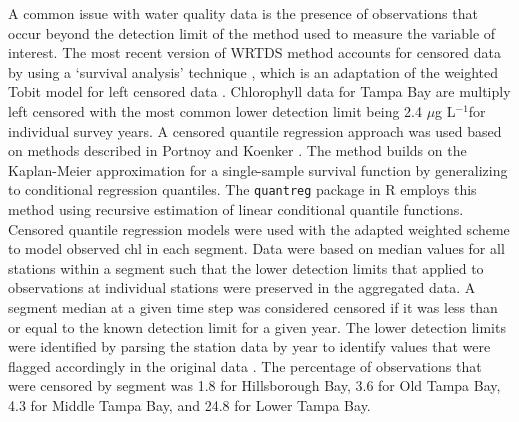 \documentclass{svjour3}\usepackage[]{graphicx}\usepackage[]{color}
\newcommand{\mugl}{$\mu$g L$^{-1}$}
\begin{document}
A common issue with water quality data is the presence of observations that occur beyond the detection limit of the method used to measure the variable of interest.  The most recent version of \ac{WRTDS} method accounts for censored data by using a `survival analysis' technique \cite{Moyer12,Hirsch14}, which is an adaptation of the weighted Tobit model for left censored data \cite{Tobin58}.  Chlorophyll data for Tampa Bay are multiply left censored with the most common lower detection limit being 2.4 \mugl for individual survey years.  A censored quantile regression approach was used based on methods described in Portnoy \cite{Portnoy03} and Koenker \cite{Koenker08}.  The method builds on the Kaplan-Meier approximation for a single-sample survival function by generalizing to conditional regression quantiles.  The \texttt{quantreg} package in R \cite{Koenker13} employs this method using recursive estimation of linear conditional quantile functions.  Censored quantile regression models were used with the adapted weighted scheme to model observed \ac{chl} in each segment.  Data were based on median values for all stations within a segment such that the lower detection limits that applied to observations at individual stations were preserved in the aggregated data.  A segment median at a given time step was considered censored if it was less than or equal to the known detection limit for a given year.  The lower detection limits were identified by parsing the station data by year to identify values that were flagged accordingly in the original data \cite{TBEP11}.  The percentage of observations that were censored by segment was 1.8 for Hillsborough Bay, 3.6 for Old Tampa Bay, 4.3 for Middle Tampa Bay, and 24.8 for Lower Tampa Bay.
\end{document}
